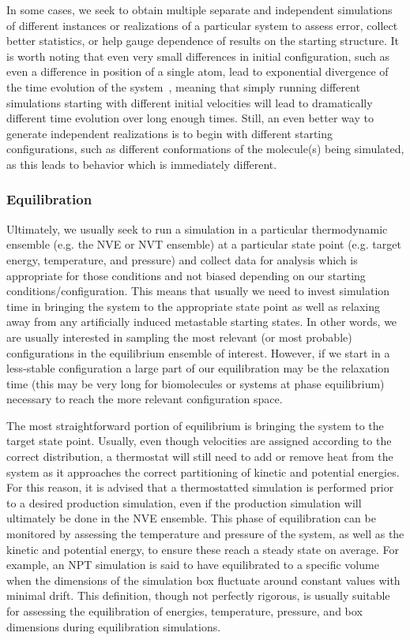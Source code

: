 \documentclass[9pt,bestpractices]{livecoms}
\begin{document}
In some cases, we seek to obtain multiple separate and independent simulations of different instances or realizations of a particular system to assess error, collect better statistics, or help gauge dependence of results on the starting structure.
It is worth noting that even very small differences in initial configuration, such as even a difference in position of a single atom, lead to exponential divergence of the time evolution of the system~\cite{allen_computer_2017}, meaning that simply running different simulations starting with different initial velocities will lead to dramatically different time evolution over long enough times.
Still, an even better way to generate independent realizations is to begin with different starting configurations, such as different conformations of the molecule(s) being simulated, as this leads to behavior which is immediately different.

\subsubsection{Equilibration}

Ultimately, we usually seek to run a simulation in a particular thermodynamic ensemble (e.g. the NVE or NVT ensemble) at a particular state point (e.g. target energy, temperature, and pressure) and collect data for analysis which is appropriate for those conditions and not biased depending on our starting conditions/configuration.
This means that usually we need to invest simulation time in bringing the system to the appropriate state point as well as relaxing away from any artificially induced metastable starting states.
In other words, we are usually interested in sampling the most relevant (or most probable) configurations in the equilibrium ensemble of interest.
However, if we start in a less-stable configuration a large part of our equilibration may be the relaxation time (this may be very long for biomolecules or systems at phase equilibrium) necessary to reach the more relevant configuration space.

The most straightforward portion of equilibrium is bringing the system to the target state point.
Usually, even though velocities are assigned according to the correct distribution, a thermostat will still need to add or remove heat from the system as it approaches the correct partitioning of kinetic and potential energies.
For this reason, it is advised that a thermostatted simulation is performed prior to a desired production simulation, even if the production simulation will ultimately be done in the NVE ensemble. 
This phase of equilibration can be monitored by assessing the temperature and pressure of the system, as well as the kinetic and potential energy, to ensure these reach a steady state on average.
For example, an NPT simulation is said to have equilibrated to a specific volume when the dimensions of the simulation box fluctuate around constant values with minimal drift. 
This definition, though not perfectly rigorous, is usually suitable for assessing the equilibration of energies, temperature, pressure, and box dimensions during equilibration simulations.
\end{document}
